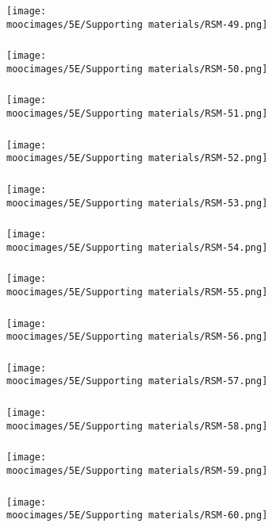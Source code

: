 \documentclass[handout,11pt,aspectratio=169,mathserif]{beamer}
\begin{document}
\begin{frame}\frametitle{}
	\centerline{\texttt{[image: \\moocimages/5E/Supporting materials/RSM-49.png]}}
\end{frame}
\begin{frame}\frametitle{}
	\centerline{\texttt{[image: \\moocimages/5E/Supporting materials/RSM-50.png]}}
\end{frame}
\begin{frame}\frametitle{}
	\centerline{\texttt{[image: \\moocimages/5E/Supporting materials/RSM-51.png]}}
\end{frame}
\begin{frame}\frametitle{}
	\centerline{\texttt{[image: \\moocimages/5E/Supporting materials/RSM-52.png]}}
\end{frame}
\begin{frame}\frametitle{}
	\centerline{\texttt{[image: \\moocimages/5E/Supporting materials/RSM-53.png]}}
\end{frame}
\begin{frame}\frametitle{}
	\centerline{\texttt{[image: \\moocimages/5E/Supporting materials/RSM-54.png]}}
\end{frame}
\begin{frame}\frametitle{}
	\centerline{\texttt{[image: \\moocimages/5E/Supporting materials/RSM-55.png]}}
\end{frame}
\begin{frame}\frametitle{}
	\centerline{\texttt{[image: \\moocimages/5E/Supporting materials/RSM-56.png]}}
\end{frame}
\begin{frame}\frametitle{}
	\centerline{\texttt{[image: \\moocimages/5E/Supporting materials/RSM-57.png]}}
\end{frame}
\begin{frame}\frametitle{}
	\centerline{\texttt{[image: \\moocimages/5E/Supporting materials/RSM-58.png]}}
\end{frame}
\begin{frame}\frametitle{}
	\centerline{\texttt{[image: \\moocimages/5E/Supporting materials/RSM-59.png]}}
\end{frame}
\begin{frame}\frametitle{}
	\centerline{\texttt{[image: \\moocimages/5E/Supporting materials/RSM-60.png]}}
\end{frame}
\end{document}
